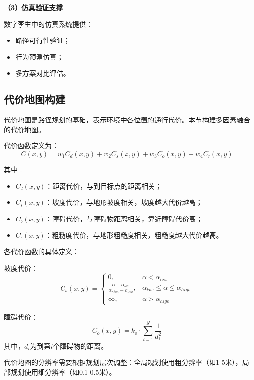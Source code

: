 \textbf{（3）仿真验证支撑}

数字孪生中的仿真系统提供：
\begin{itemize}
    \item 路径可行性验证；
    \item 行为预测仿真；
    \item 多方案对比评估。
\end{itemize}

\subsection{代价地图构建}
\label{subsec:cost_map}

代价地图是路径规划的基础，表示环境中各位置的通行代价。本节构建多因素融合的代价地图。

代价函数定义为：
\begin{equation}
    C(x, y) = w_1 C_d(x, y) + w_2 C_s(x, y) + w_3 C_o(x, y) + w_4 C_r(x, y)
    \label{eq:cost_function}
\end{equation}

其中：
\begin{itemize}
    \item $C_d(x, y)$：距离代价，与到目标点的距离相关；
    \item $C_s(x, y)$：坡度代价，与地形坡度相关，坡度越大代价越高；
    \item $C_o(x, y)$：障碍代价，与障碍物距离相关，靠近障碍代价高；
    \item $C_r(x, y)$：粗糙度代价，与地形粗糙度相关，粗糙度越大代价越高。
\end{itemize}

各代价函数的具体定义：

坡度代价：
\begin{equation}
    C_s(x, y) = \begin{cases}
        0, & \alpha < \alpha_{low} \\
        \frac{\alpha - \alpha_{low}}{\alpha_{high} - \alpha_{low}}, & \alpha_{low} \le \alpha \le \alpha_{high} \\
        \infty, & \alpha > \alpha_{high}
    \end{cases}
    \label{eq:cost_slope}
\end{equation}

障碍代价：
\begin{equation}
    C_o(x, y) = k_o \cdot \sum_{i=1}^{N} \frac{1}{d_i^2}
    \label{eq:cost_obstacle}
\end{equation}
其中，$d_i$为到第$i$个障碍物的距离。

代价地图的分辨率需要根据规划层次调整：全局规划使用粗分辨率（如1-5米），局部规划使用细分辨率（如0.1-0.5米）。
